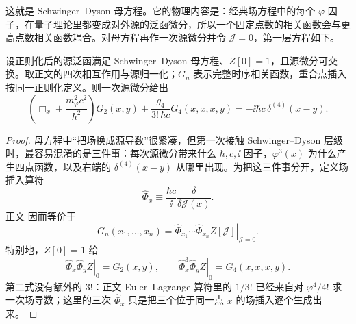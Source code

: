 这就是 Schwinger--Dyson 母方程。它的物理内容是：经典场方程中的每个 $\varphi$ 因子，在量子理论里都变成对外源的泛函微分，所以一个固定点数的相关函数会与更高点数相关函数耦合。对母方程再作一次源微分并令 $\mathcal J=0$，第一层方程如下。
\begin{proposition}[四次标量相互作用的相关函数层级]
设正则化后的源泛函满足 Schwinger--Dyson 母方程、$Z[0]=1$，且源微分可交换。取正文的四次相互作用与源归一化；$G_n$ 表示完整时序相关函数，重合点插入按同一正则化定义。则一次源微分给出
\begin{equation}
 \boxed{
 \left(\Box_x+\frac{m_\varphi^2c^2}{\hbar^2}\right)G_2(x,y)
 +\frac{g_4}{3!\,\hbar c}G_4(x,x,x,y)
 =-\ii\hbar c\,\delta^{(4)}(x-y).}
 \label{eq:SD-two-four-hierarchy-dp76}
\end{equation}
\end{proposition}
\begin{proof}
母方程中“把场换成源导数”很紧凑，但第一次接触 Schwinger--Dyson 层级时，最容易混淆的是三件事：每次源微分带来什么 $\hbar,c,\ii$ 因子，$\varphi^3(x)$ 为什么产生四点函数，以及右端的 $\delta^{(4)}(x-y)$ 从哪里出现。为把这三件事分开，定义场插入算符
\begin{equation*}
\widehat\Phi_x
\equiv\frac{\hbar c}{\ii}\frac{\delta}{\delta\mathcal J(x)}.
\end{equation*}
正文 因而等价于
\begin{equation*}
G_n(x_1,\ldots,x_n)
=\left.
\widehat\Phi_{x_1}\cdots\widehat\Phi_{x_n}Z[\mathcal J]
\right|_{\mathcal J=0}.
\end{equation*}
特别地，$Z[0]=1$ 给
\begin{equation*}
\left.\widehat\Phi_x\widehat\Phi_yZ\right|_0=G_2(x,y),
\qquad
\left.\widehat\Phi_x^3\widehat\Phi_yZ\right|_0=G_4(x,x,x,y).
\end{equation*}
第二式没有额外的 $3!$：正文 Euler--Lagrange 算符里的 $1/3!$ 已经来自对 $\varphi^4/4!$ 求一次场导数；这里的三次 $\widehat\Phi_x$ 只是把三个位于同一点 $x$ 的场插入逐个生成出来。


\end{proof}
